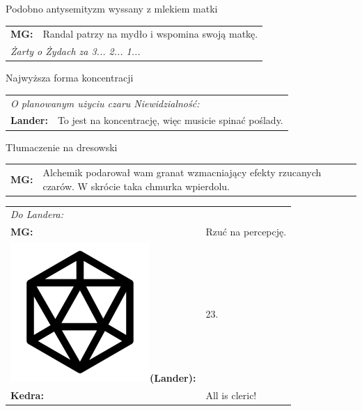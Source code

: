 \documentclass[10pt,twoside,twocolumn]{book}
\begin{document}
\begin{rpg-quotebox}{Podobno antysemityzm wyssany z mlekiem matki}
   \begin{tabularx}{\columnwidth}{lX}
      \textbf{MG:} & Randal patrzy na mydło i wspomina swoją matkę.\\
      \multicolumn{2}{l}{\textit{Żarty o Żydach za 3... 2... 1...}}\\
   \end{tabularx}
\end{rpg-quotebox}


\begin{rpg-quotebox}{Najwyższa forma koncentracji}
   \begin{tabularx}{\columnwidth}{lX}
      \multicolumn{2}{l}{\textit{O planowanym użyciu czaru Niewidzialność:}}\\
      \textbf{Lander:} & To jest na koncentrację, więc musicie spinać poślady.\\
   \end{tabularx}
\end{rpg-quotebox}


\begin{rpg-quotebox}{Tłumaczenie na dresowski}
   \begin{tabularx}{\columnwidth}{lX}
      \textbf{MG:} & Alchemik podarował wam granat wzmacniający efekty rzucanych czarów. W skrócie taka chmurka wpierdolu.\\
   \end{tabularx}
\end{rpg-quotebox}


\begin{rpg-quotebox}{}
   \begin{tabularx}{\columnwidth}{lX}
      \multicolumn{2}{l}{\textit{Do Landera:}}\\
      \textbf{MG:} & Rzuć na percepcję.\\
      \includegraphics[scale=0.055]{img/d20.png}\textbf{(Lander):}& 23.\\
      \textbf{Kedra:} & All is cleric!\\
   \end{tabularx}
\end{rpg-quotebox}
\end{document}
